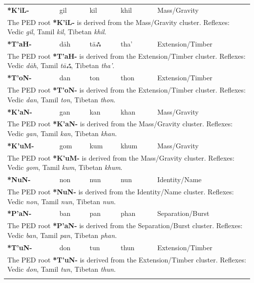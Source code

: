 \begin{longtable}{p{} p{} p{} p{} p{}}
\textbf{*K'iL-} & gil & kil & khil & Mass/Gravity \\ 
\multicolumn{5}{p{\textwidth}}{\small The PED root \textbf{*K'iL-} is derived from the Mass/Gravity cluster. Reflexes: Vedic \textit{gil}, Tamil \textit{kil}, Tibetan \textit{khil}. } \\ \addlinespace 
\textbf{*T'aH-} & dāh & tāஃ & tha' & Extension/Timber \\ 
\multicolumn{5}{p{\textwidth}}{\small The PED root \textbf{*T'aH-} is derived from the Extension/Timber cluster. Reflexes: Vedic \textit{dāh}, Tamil \textit{tāஃ}, Tibetan \textit{tha'}. } \\ \addlinespace 
\textbf{*T'oN-} & dan & ton & thon & Extension/Timber \\ 
\multicolumn{5}{p{\textwidth}}{\small The PED root \textbf{*T'oN-} is derived from the Extension/Timber cluster. Reflexes: Vedic \textit{dan}, Tamil \textit{ton}, Tibetan \textit{thon}. } \\ \addlinespace 
\textbf{*K'aN-} & gan & kan & khan & Mass/Gravity \\ 
\multicolumn{5}{p{\textwidth}}{\small The PED root \textbf{*K'aN-} is derived from the Mass/Gravity cluster. Reflexes: Vedic \textit{gan}, Tamil \textit{kan}, Tibetan \textit{khan}. } \\ \addlinespace 
\textbf{*K'uM-} & gom & kum & khum & Mass/Gravity \\ 
\multicolumn{5}{p{\textwidth}}{\small The PED root \textbf{*K'uM-} is derived from the Mass/Gravity cluster. Reflexes: Vedic \textit{gom}, Tamil \textit{kum}, Tibetan \textit{khum}. } \\ \addlinespace 
\textbf{*NuN-} & non & nun & nun & Identity/Name \\ 
\multicolumn{5}{p{\textwidth}}{\small The PED root \textbf{*NuN-} is derived from the Identity/Name cluster. Reflexes: Vedic \textit{non}, Tamil \textit{nun}, Tibetan \textit{nun}. } \\ \addlinespace 
\textbf{*P'aN-} & ban & pan & phan & Separation/Burst \\ 
\multicolumn{5}{p{\textwidth}}{\small The PED root \textbf{*P'aN-} is derived from the Separation/Burst cluster. Reflexes: Vedic \textit{ban}, Tamil \textit{pan}, Tibetan \textit{phan}. } \\ \addlinespace 
\textbf{*T'uN-} & don & tun & thun & Extension/Timber \\ 
\multicolumn{5}{p{\textwidth}}{\small The PED root \textbf{*T'uN-} is derived from the Extension/Timber cluster. Reflexes: Vedic \textit{don}, Tamil \textit{tun}, Tibetan \textit{thun}. } \\ \addlinespace 

\end{longtable}
